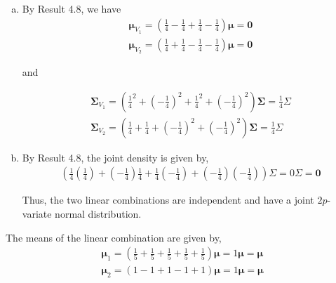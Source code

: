 \documentclass[12pt]{article}\usepackage[]{graphicx}\usepackage[]{color}
\newenvironment{problem}[2][Problem]{\begin{trivlist}
\item[\hskip \labelsep {\bfseries #1}\hskip \labelsep {\bfseries #2.}]}{\end{trivlist}}
\newcommand{\vct}{\mathbf}
\begin{document}
\begin{problem}{4.16}
\end{problem}

\begin{enumerate}[a)]

\item By Result 4.8, we have
\begin{align*}
\vct{\mu}_{V_1} = \left(\frac{1}{4} - \frac{1}{4} + \frac{1}{4} - \frac{1}{4}\right)\vct{\mu} = \vct{0}\\
\vct{\mu}_{V_2} = \left(\frac{1}{4} + \frac{1}{4} - \frac{1}{4} - \frac{1}{4}\right)\vct{\mu} = \vct{0}
\end{align*}

and

\begin{align*}
\vct{\Sigma}_{V_1} = \left(\frac{1}{4}^2 + \left(-\frac{1}{4}\right)^2 + \frac{1}{4}^2 + \left(-\frac{1}{4}\right)^2\right)\vct{\Sigma} = \frac{1}{4}\Sigma\\
\vct{\Sigma}_{V_2} = \left(\frac{1}{4} + \frac{1}{4} + \left(-\frac{1}{4}\right)^2 + \left(-\frac{1}{4}\right)^2\right)\vct{\Sigma} = \frac{1}{4}\Sigma
\end{align*}

\item By Result 4.8, the joint density is given by,
\begin{align*}
\left(\frac{1}{4}\left(\frac{1}{4}\right) + \left(-\frac{1}{4}\right)\frac{1}{4} + \frac{1}{4}\left(-\frac{1}{4}\right) + \left(-\frac{1}{4}\right)\left(-\frac{1}{4}\right) \right)\Sigma = 0\Sigma = \vct{0}
\end{align*}

Thus, the two linear combinations are independent and have a joint $2p$-variate normal distribution.

\end{enumerate}
\newpage

\begin{problem}{4.17}
\end{problem}

The means of the linear combination are given by,
\begin{align*}
\vct{\mu}_1 = \left(\frac{1}{5} + \frac{1}{5} + \frac{1}{5} + \frac{1}{5} + \frac{1}{5}\right)\vct{\mu} = 1\vct{\mu} = \vct{\mu}\\
\vct{\mu}_2 = \left(1 - 1 + 1 - 1 + 1\right)\vct{\mu} = 1\vct{\mu} = \vct{\mu}
\end{align*}
\end{document}
